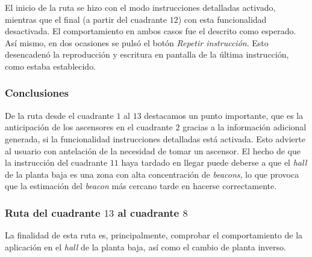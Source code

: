 El inicio de la ruta se hizo con el modo instrucciones detalladas activado, mientras que el final (a partir del cuadrante $12$) con esta funcionalidad desactivada. El comportamiento en ambos casos fue el descrito como esperado. Así mismo, en dos ocasiones se pulsó el botón \textit{Repetir instrucción}. Esto desencadenó la reproducción y escritura en pantalla de la última instrucción, como estaba establecido. 

\subsubsection*{Conclusiones}


De la ruta desde el cuadrante $1$ al $13$ destacamos un punto importante, que es la anticipación de los ascensores en el cuadrante $2$ gracias a la información adicional generada, si la funcionalidad instrucciones detalladas está activada. Esto advierte al usuario con antelación de la necesidad de tomar un ascensor. El hecho de que la instrucción del cuadrante $11$ haya tardado en llegar puede deberse a que el \textit{hall} de la planta baja es una zona con alta concentración de \textit{beacons}, lo que provoca que la estimación del \textit{beacon} más cercano tarde en hacerse correctamente. 

\subsubsection{Ruta del cuadrante $13$ al cuadrante $8$}
\label{subsub:13al8}

La finalidad de esta ruta es, principalmente, comprobar el comportamiento de la aplicación en el \textit{hall} de la planta baja, así como el cambio de planta inverso. 

